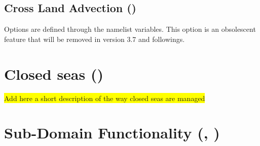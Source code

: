 \documentclass[NEMO_book]{subfiles}
\begin{document}
\subsection{Cross Land Advection ()}
\label{MISC_strait_cla}

Options are defined through the   namelist variables.
This option is an obsolescent feature that will be removed in version 3.7 and followings. 


\section{Closed seas ()}
\label{MISC_closea}

\colorbox{yellow}{Add here a short description of the way closed seas are managed}


\section{Sub-Domain Functionality (, )}
\label{MISC_zoom}
\end{document}
